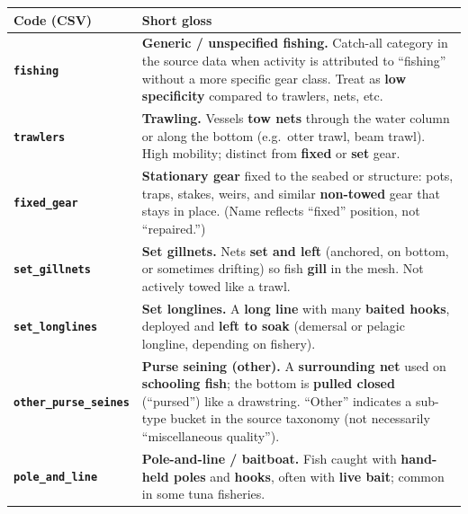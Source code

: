 \documentclass[
]{article}
\newcounter{none} %
\begin{document}
{\def\LTcaptype{none} %
\begin{longtable}[]{@{}
  >{\raggedright\arraybackslash}p{}
  >{\raggedright\arraybackslash}p{}@{}}
\toprule\noalign{}
\begin{minipage}[b]{\linewidth}\raggedright
Code (CSV)
\end{minipage} & \begin{minipage}[b]{\linewidth}\raggedright
Short gloss
\end{minipage} \\
\midrule\noalign{}
\endhead
\bottomrule\noalign{}
\endlastfoot
\textbf{\texttt{fishing}} & \textbf{Generic / unspecified fishing.}
Catch-all category in the source data when activity is attributed to
``fishing'' without a more specific gear class. Treat as \textbf{low
specificity} compared to trawlers, nets, etc. \\
\textbf{\texttt{trawlers}} & \textbf{Trawling.} Vessels \textbf{tow
nets} through the water column or along the bottom (e.g.~otter trawl,
beam trawl). High mobility; distinct from \textbf{fixed} or \textbf{set}
gear. \\
\textbf{\texttt{fixed\_gear}} & \textbf{Stationary gear} fixed to the
seabed or structure: pots, traps, stakes, weirs, and similar
\textbf{non-towed} gear that stays in place. (Name reflects ``fixed''
position, not ``repaired.'') \\
\textbf{\texttt{set\_gillnets}} & \textbf{Set gillnets.} Nets
\textbf{set and left} (anchored, on bottom, or sometimes drifting) so
fish \textbf{gill} in the mesh. Not actively towed like a trawl. \\
\textbf{\texttt{set\_longlines}} & \textbf{Set longlines.} A
\textbf{long line} with many \textbf{baited hooks}, deployed and
\textbf{left to soak} (demersal or pelagic longline, depending on
fishery). \\
\textbf{\texttt{other\_purse\_seines}} & \textbf{Purse seining (other).}
A \textbf{surrounding net} used on \textbf{schooling fish}; the bottom
is \textbf{pulled closed} (``pursed'') like a drawstring. ``Other''
indicates a sub-type bucket in the source taxonomy (not necessarily
``miscellaneous quality''). \\
\textbf{\texttt{pole\_and\_line}} & \textbf{Pole-and-line / baitboat.}
Fish caught with \textbf{hand-held poles} and \textbf{hooks}, often with
\textbf{live bait}; common in some tuna fisheries. \\
\end{longtable}
}
\end{document}
